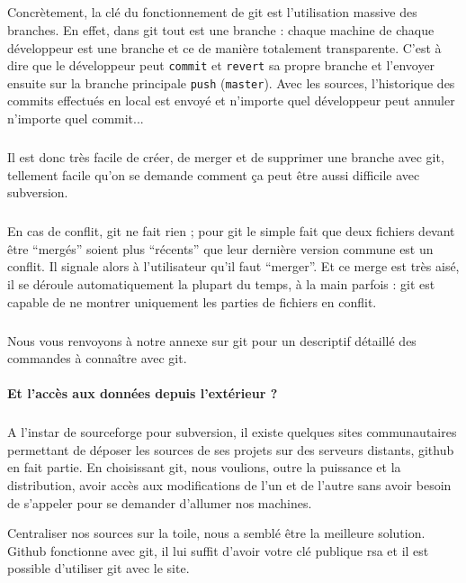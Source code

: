 \subparagraph{} Concrètement, la clé du fonctionnement de git est l'utilisation massive des branches. En effet, dans git tout est une branche : chaque machine de chaque développeur est une branche et ce de manière totalement transparente. C'est à dire que le développeur peut \verb|commit| et \verb|revert| sa propre branche et l'envoyer ensuite sur la branche principale \verb|push| (\verb|master|). Avec les sources, l'historique des commits effectués en local est envoyé et n'importe quel développeur peut annuler n'importe quel commit...

\subparagraph{} Il est donc très facile de créer, de merger et de supprimer une branche avec git, tellement facile qu'on se demande comment ça peut être aussi difficile avec subversion.

\subparagraph{} En cas de conflit, git ne fait rien ; pour git le simple fait que deux fichiers devant être ``mergés'' soient plus ``récents'' que leur dernière version commune est un conflit. Il signale alors à l'utilisateur qu'il faut ``merger''. Et ce merge est très aisé, il se déroule automatiquement la plupart du temps, à la main parfois : git est capable de ne montrer uniquement les parties de fichiers en conflit.


\subparagraph{}Nous vous renvoyons à notre annexe sur git pour un descriptif détaillé des commandes à connaître avec git.


\paragraph{Et l'accès aux données depuis l'extérieur ?}
\subparagraph{} A l'instar de sourceforge pour subversion, il existe quelques sites communautaires permettant de déposer les sources de ses projets sur des serveurs distants, github en fait partie. En choisissant git, nous voulions, outre la puissance et la distribution, avoir accès aux modifications de l'un et de l'autre sans avoir besoin de s'appeler pour se demander d'allumer nos machines.

Centraliser nos sources sur la toile, nous a semblé être la meilleure solution. Github fonctionne avec git, il lui suffit d'avoir votre clé publique rsa et il est possible d'utiliser git avec le site. 

